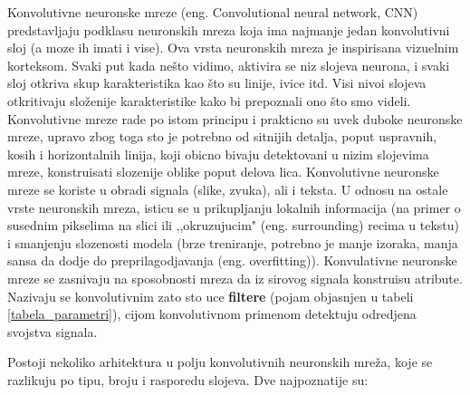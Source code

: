 \documentclass[a4paper]{article}
\begin{document}

Konvolutivne neuronske mreze (eng. Convolutional neural network, CNN) predstavljaju podklasu neuronskih mreza koja ima najmanje jedan konvolutivni sloj (a moze ih imati i vise). Ova vrsta neuronskih mreza je inspirisana vizuelnim korteksom. Svaki put kada nešto vidimo, aktivira se niz slojeva neurona, i svaki sloj otkriva skup karakteristika kao što su linije, ivice itd. Visi nivoi slojeva otkritivaju složenije karakteristike kako bi prepoznali ono što smo videli. Konvolutivne mreze rade po istom principu i prakticno su uvek duboke neuronske mreze, upravo zbog toga sto je potrebno od sitnijih detalja, poput uspravnih, kosih i horizontalnih linija, koji obicno bivaju detektovani u nizim slojevima mreze, konstruisati slozenije oblike poput delova lica. Konvolutivne neuronske mreze se koriste u obradi signala (slike, zvuka), ali i teksta. U odnosu na ostale vrste neuronskih mreza, isticu se u prikupljanju lokalnih informacija (na primer o susednim pikselima na slici ili ,,okruzujucim" (eng. surrounding) recima u tekstu) i smanjenju slozenosti modela (brze treniranje, potrebno je manje izoraka, manja sansa da dodje do preprilagodjavanja (eng. overfitting)). Konvulativne neuronske mreze se zasnivaju na sposobnosti mreza da iz sirovog signala konstruisu atribute. Nazivaju se konvolutivnim zato sto uce \textbf{filtere} (pojam objasnjen u tabeli \ref{tabela_parametri}), cijom konvolutivnom primenom detektuju odredjena svojstva signala.

Postoji nekoliko arhitektura u polju konvolutivnih neuronskih mreža, koje se razlikuju po tipu, broju i rasporedu slojeva. Dve najpoznatije su:
\end{document}
